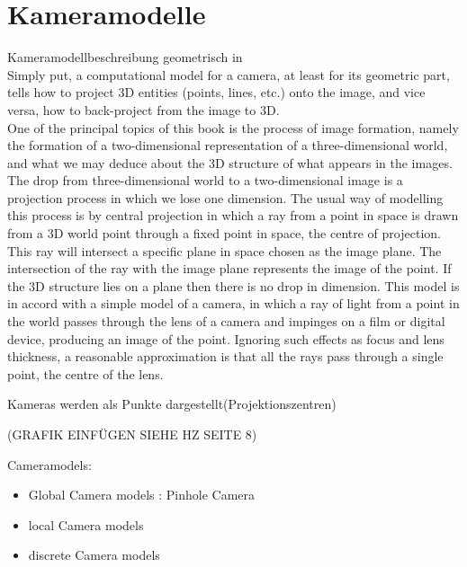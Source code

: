 \chapter{Kameramodelle}
\label{sec:CameraModels}



Kameramodellbeschreibung geometrisch in \cite{Jianzhong}\\


Simply put, a computational model for
a camera, at least for its geometric part, tells how to project 3D entities
(points, lines, etc.) onto the image, and vice versa, how to back-project
from the image to 3D.\cite{CamerModels.}\\

One of the principal topics of this book is the process of image formation, namely the
formation of a two-dimensional representation of a three-dimensional world, and what
we may deduce about the 3D structure of what appears in the images.
The drop from three-dimensional world to a two-dimensional image is a projection
process in which we lose one dimension. The usual way of modelling this process is
by central projection in which a ray from a point in space is drawn from a 3D world
point through a fixed point in space, the centre of projection.\cite{HZ}\\

This ray will intersect a
specific plane in space chosen as the image plane. The intersection of the ray with the
image plane represents the image of the point. If the 3D structure lies on a plane then
there is no drop in dimension.
This model is in accord with a simple model of a camera, in which a ray of light
from a point in the world passes through the lens of a camera and impinges on a film or
digital device, producing an image of the point. Ignoring such effects as focus and lens
thickness, a reasonable approximation is that all the rays pass through a single point,
the centre of the lens.\cite{HZ}

Kameras werden als Punkte dargestellt(Projektionszentren)

(GRAFIK EINFÜGEN SIEHE HZ SEITE 8)

Cameramodels:
\begin{itemize}
	\item Global Camera models : Pinhole Camera
	\item local Camera models
	\item discrete Camera models
\end{itemize}


